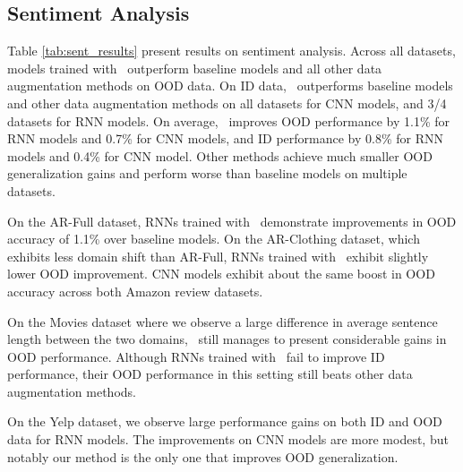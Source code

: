 
\subsection{Sentiment Analysis}
\label{subsec:sentiment_exp}
Table \ref{tab:sent_results} present results on sentiment analysis. 
Across all datasets, models trained with \ssmba\ outperform baseline models and all other data augmentation methods on OOD data.
On ID data, \ssmba\ outperforms baseline models and other data augmentation methods on all datasets for CNN models, and 3/4 datasets for RNN models.
On average, \ssmba\ improves OOD performance by 1.1\% for RNN models and 0.7\% for CNN models, and ID performance by 0.8\% for RNN models and 0.4\% for CNN model.
Other methods achieve much smaller OOD generalization gains and perform worse than baseline models on multiple datasets.

On the AR-Full dataset, RNNs trained with \ssmba\ demonstrate improvements in OOD accuracy of 1.1\% over baseline models.
On the AR-Clothing dataset, which exhibits less domain shift than AR-Full, RNNs trained with \ssmba\ exhibit slightly lower OOD improvement.
CNN models exhibit about the same boost in OOD accuracy across both Amazon review datasets.

On the Movies dataset where we observe a large difference in average sentence length between the two domains, \ssmba\ still manages to present considerable gains in OOD performance.
Although RNNs trained with \ssmba\ fail to improve ID performance, their OOD performance in this setting still beats other data augmentation methods.

On the Yelp dataset, we observe large performance gains on both ID and OOD data for RNN models.
The improvements on CNN models are more modest, but notably our method is the only one that improves OOD generalization.



